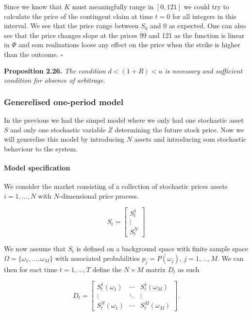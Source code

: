 \documentclass[
]{article}
\begin{document}
Since we know that \(K\) must meaningfully range in \([0,121]\) we could
try to calculate the price of the contingent claim at time \(t=0\) for
all integers in this interval. We see that the price range between
\(S_0\) and 0 as expected. One can also see that the price changes slope
at the prices 99 and 121 as the function is linear in \(\Phi\) and som
realisations loose any effect on the price when the strike is higher
than the outcome. \(\square\)

\textbf{Proposition 2.26.} \emph{The condition \(d<(1+R)<u\) is
necessary and sufficient condition for absence of arbitrage.}

\hypertarget{generelised-one-period-model}{%
\subsubsection{Generelised one-period
model}\label{generelised-one-period-model}}

In the previous we had the simpel model where we only had one stochastic
asset \(S\) and only one stochastic variable \(Z\) determining the
future stock price. Now we will generelise this model by introducing
\(N\) assets and introducing som stochastic behaviour to the system.

\hypertarget{model-specification}{%
\paragraph{Model specification}\label{model-specification}}

We consider the market consisting of a collection of stochastic prices
assets \(i=1,...,N\) with \(N\)-dimensional price process.

\[
S_t=\begin{bmatrix} S_t^1\\
\vdots\\
S_t^N\end{bmatrix}
\]

We now assume that \(S_t\) is defined on a background space with finite
sample space \(\Omega = \{\omega_1,...,\omega_M\}\) with associated
probabilities \(p_j=P(\omega_j)\), \(j=1,...,M\). We can then for eact
time \(t=1,...,T\) define the \(N\times M\) matrix \(D_t\) as such

\[
D_t=\begin{bmatrix} S_t^1(\omega_1)&\cdots &S_t^1(\omega_M)\\
\vdots &\ddots & \vdots\\
S_t^N(\omega_1) &\cdots&S_t^M(\omega_M)\end{bmatrix}.
\]
\end{document}
